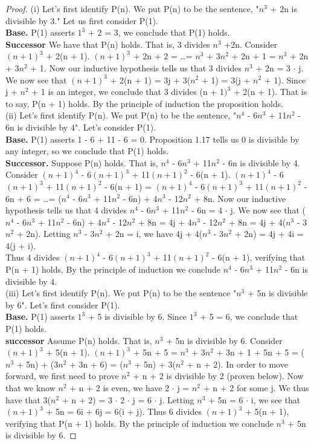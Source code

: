 \documentclass[12pt]{amsart}
\begin{document}
\begin{proof}
	(i) Let's first identify P(n). We put P(n) to be the sentence, "$n^3$ + 2n is divisible by 3." Let us first consider P(1). 
\\\textbf{Base.} P(1) asserts $1^3$ + 2 = 3, we conclude that P(1) holds.
\\\textbf{Successor} We have that P(n) holds. That is, 3 divides $n^3$ +2n. Consider $(n + 1)^3$ + 2(n + 1). $(n +1)^3$ + 2n + 2 = \dots = $n^3$ + 3$n^2$ + 2n + 1 = $n^3$ + 2n + 3$n^2$ + 1. Now our inductive hypothesis tells us that 3 divides $n^3$ + 2n = 3 $\cdot$ j. We now see that $(n + 1)^3$ + 2(n + 1) = 3j + 3($n^2$ + 1) = 3(j + $n^2$ + 1). Since j + $n^2$ + 1 is an integer, we conclude that 3 divides (n + 1$)^3$ + 2(n + 1). That is to say, P(n + 1) holds. By the principle of induction the proposition holds.
\\\indent (ii) Let's first identify P(n). We put P(n) to be the sentence, "$n^4$ - 6$n^3$ + 11$n^2$ - 6n is divisible by 4". Let's consider P(1).
\\\textbf{Base.} P(1) asserts 1 - 6 + 11 - 6 = 0. Proposition 1.17 tells us 0 is divisible by any integer, so we conclude that P(1) holds.
\\\textbf{Successor.} Suppose P(n) holds. That is, $n^4$ - 6$n^3$ + 11$n^2$ - 6n is divisible by 4. Consider $(n + 1)^4$ - 6$(n + 1)^3$ + 11$(n + 1)^2$ - 6(n + 1). $(n + 1)^4$ - 6$(n + 1)^3$ + 11$(n + 1)^2$ - 6(n + 1) = $(n + 1)^4$ - 6$(n + 1)^3$ + 11$(n + 1)^2$ - 6n + 6 = \dots = ($n^4$ - 6$n^3$ + 11$n^2$ - 6n) + 4$n^3$ - 12$n^2$ + 8n. Now our inductive hypothesis tells us that 4 divides $n^4$ - 6$n^3$ + 11$n^2$ - 6n = 4 $\cdot$ j. We now see that ($n^4$ - 6$n^3$ + 11$n^2$ - 6n) + 4$n^3$ - 12$n^2$ + 8n = 4j + 4$n^3$ - 12$n^2$ + 8n = 4j + 4($n^3$ - 3$n^2$ + 2n). Letting $n^3$ - 3$n^2$ + 2n = i, we have 4j + 4($n^3$ - 3$n^2$ + 2n) = 4j + 4i = 4(j + i). \\Thus 4 divides $(n + 1)^4$ - 6$(n + 1)^3$ + 11$(n + 1)^2$ - 6(n + 1), verifying that P(n + 1) holds. By the principle of induction we conclude $n^4$ - 6$n^3$ + 11$n^2$ - 6n is divisible by 4.
\\\indent (iii) Let's first identify P(n). We put P(n) to be the sentence "$n^3$ + 5n is divisible by 6". Let's first consider P(1).
\\\textbf{Base.} P(1) asserts $1^3$ + 5 is divisible by 6. Since $1^3$ + 5 = 6, we conclude that P(1) holds.
\\\textbf{successor} Assume P(n) holds. That is, $n^3$ + 5n is divisible by 6. Consider $(n + 1)^3$ + 5(n + 1). $(n + 1)^3$ + 5n + 5 = $n^3$ + 3$n^2$ + 3n + 1 + 5n + 5 = ($n^3$ + 5n) + ($3n^2$ + 3n + 6) = ($n^3$ + 5n) + 3($n^2$ + n + 2). In order to move forward, we first need to prove $n^2$ + n + 2 is divisible by 2 (proven below). Now that we know $n^2$ + n + 2 is even, we have 2 $\cdot$ j = $n^2$ + n + 2 for some j. We thus have that 3($n^2$ + n + 2) = 3 $\cdot$ 2 $\cdot$ j = 6 $\cdot$ j. Letting $n^3$ + 5n = 6 $\cdot$ i, we see that $(n + 1)^3$ + 5n = 6i + 6j = 6(i + j). Thus 6 divides $(n + 1)^3$ + 5(n + 1), verifying that P(n + 1) holds. By the principle of induction we conclude $n^3$ + 5n is divisible by 6.
\end{proof}
\end{document}
